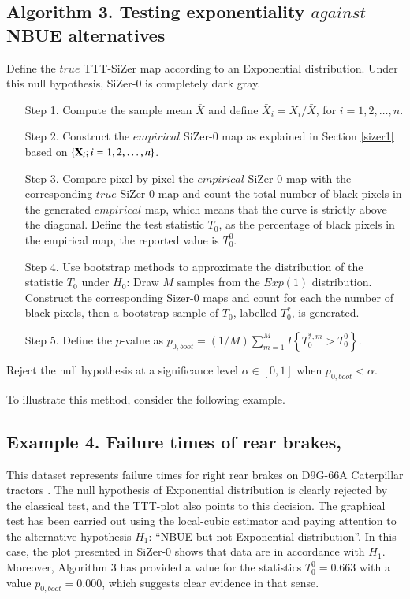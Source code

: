 \documentclass[preprint,12pt]{elsarticle}
\begin{document}
\subsection*{Algorithm 3. Testing exponentiality $against$ NBUE alternatives} 
Define the $true$ TTT-SiZer map according to an Exponential distribution. Under this null hypothesis, SiZer-0 is completely dark gray. 
\begin{enumerate}
\item[Step 1.] Compute the sample mean $\bar{X}$ and define $\bar{X}_i=X_i/\bar{X}$, for $ i=1,2,\ldots,n$.
\item[Step 2.] Construct the  $empirical$ SiZer-$0$ map as explained in Section \ref{sizer1} based on  $\{\bar{\bf X}_i; i=1, 2,\ldots, n \}$.
\item[Step 3.] Compare pixel by pixel the $empirical$ SiZer-$0$ map with the corresponding $true$ SiZer-$0$ map and count the total number of black pixels in the generated $empirical$ map, which means that the curve is strictly above the diagonal. Define the test statistic $T_0$, as the percentage of black pixels in the empirical map, the reported value is $T_0^0$.

\item[Step 4.] Use bootstrap methods to approximate the distribution of the statistic $T_0$ under $H_0$: Draw $M$ samples from the $Exp(1)$ distribution. Construct the corresponding Sizer-$0$ maps and count for each the number of black pixels, then a bootstrap sample of $T_0$, labelled $T^*_0$, is generated.

\item[Step 5.] Define the $p$-value as $p_{0,boot}=(1/M)\sum_{m=1}^M I\left\{T^{*,m}_0 > T_0^0\right\}$.
\end{enumerate}
Reject the null hypothesis at a significance level $\alpha \in [0,1]$ when $p_{0,boot} < \alpha$. 
 

To illustrate this method, consider the following example. 
\subsection*{Example 4. Failure times of rear brakes, \cite{CMO2019}}
This dataset represents failure times for right rear brakes on D9G-66A Caterpillar tractors \cite{CMO2019}. The null hypothesis of Exponential distribution is clearly rejected by the classical test, and the TTT-plot also points to this decision. The graphical test has been carried out using the local-cubic estimator and paying attention to the alternative hypothesis $H_1$: ``NBUE but not Exponential distribution''. In this case, the plot presented in SiZer-0 shows that data are in accordance with $H_1$. Moreover, Algorithm 3 has provided a value for the statistics $T_0^0=0.663$ with a value $p_{0,boot}=0.000$, which suggests clear evidence in that sense. 
\end{document}
